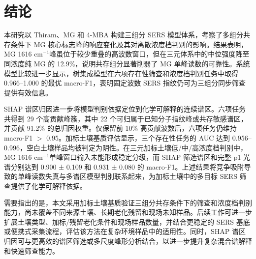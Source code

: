 \documentclass[preprint,12pt]{elsarticle}
\newcommand{\cmone}{cm$^{-1}$}
\begin{document}
\section{结论}

本研究以 Thiram、MG 和 4-MBA 构建三组分 SERS 模型体系，考察了多组分共存条件下 MG 核心标志峰的响应变化及其对离散浓度档判别的影响。结果表明，MG 1616 \cmone 峰虽位于较少重叠的高波数窗口，但在三元体系中的中位强度降至同浓度纯 MG 的 12.9\%，说明共存组分显著削弱了 MG 单峰读数的可靠性。系统模型比较进一步显示，树集成模型在六项存在性筛查和浓度档判别任务中取得 0.966--1.000 的最优 macro-F1，表明固定波数 SERS 指纹仍可为三组分同步筛查提供有效信息。

SHAP 谱区归因进一步将模型判别依据定位到化学可解释的连续谱区。六项任务共得到 29 个高贡献峰簇，其中 22 个可归属于已知分子指纹峰或共存敏感谱区，并贡献 91.2\% 的总归因权重。仅保留前 10\% 高贡献波数后，六项任务仍维持 macro-F1 $>$ 0.95。加标土壤基质评估显示，三个存在性任务的 AUC 达到 0.956--0.996，空白土壤样品均被判定为阴性。在三元加标土壤低/中/高浓度档判别中，MG 1616 \cmone 单峰窗口输入未能形成稳定分级，而 SHAP 筛选谱区和完整 p1 光谱分别达到 0.900 ± 0.109 和 0.931 ± 0.080 的 macro-F1。上述结果将竞争吸附导致的单峰读数失真与多谱区模型判别联系起来，为加标土壤中的多目标 SERS 筛查提供了化学可解释依据。

需要指出的是，本文采用加标土壤基质验证三组分共存条件下的筛查和浓度档判别能力，尚未覆盖不同来源土壤、长期老化残留和现场未知样品。后续工作可进一步扩展土壤类型、加标/残留老化条件和现场样品数量，并结合更稳定的 SERS 基底或便携式采集流程，评估该方法在复杂环境样品中的适用性。同时，SHAP 谱区归因可与更高效的谱区筛选或多尺度峰形分析结合，以进一步提升复杂混合谱解释和快速筛查能力。
\end{document}
